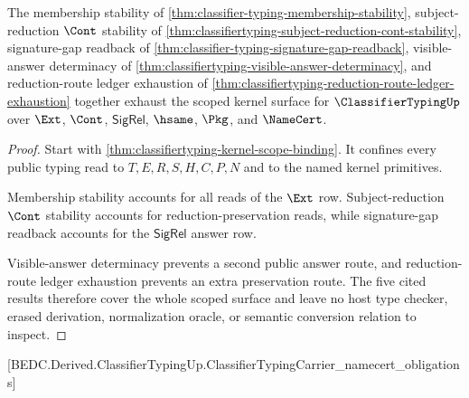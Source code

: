 \begin{theorem}
\label{thm:classifiertyping-ext-cont-sigrel-scope-exhaustion}
The membership stability of \autoref{thm:classifier-typing-membership-stability}, subject-reduction $\Cont$ stability of \autoref{thm:classifiertyping-subject-reduction-cont-stability}, signature-gap readback of \autoref{thm:classifier-typing-signature-gap-readback}, visible-answer determinacy of \autoref{thm:classifiertyping-visible-answer-determinacy}, and reduction-route ledger exhaustion of \autoref{thm:classifiertyping-reduction-route-ledger-exhaustion} together exhaust the scoped kernel surface for $\ClassifierTypingUp$ over $\Ext$, $\Cont$, $\mathsf{SigRel}$, $\hsame$, $\Pkg$, and $\NameCert$.
\end{theorem}
\begin{proof}
Start with \autoref{thm:classifiertyping-kernel-scope-binding}. It confines every public typing read to $T,E,R,S,H,C,P,N$ and to the named kernel primitives.

Membership stability accounts for all reads of the $\Ext$ row. Subject-reduction $\Cont$ stability accounts for reduction-preservation reads, while signature-gap readback accounts for the $\mathsf{SigRel}$ answer row.

Visible-answer determinacy prevents a second public answer route, and reduction-route ledger exhaustion prevents an extra preservation route. The five cited results therefore cover the whole scoped surface and leave no host type checker, erased derivation, normalization oracle, or semantic conversion relation to inspect.
\end{proof}

[BEDC.Derived.ClassifierTypingUp.ClassifierTypingCarrier\_namecert\_obligations]


